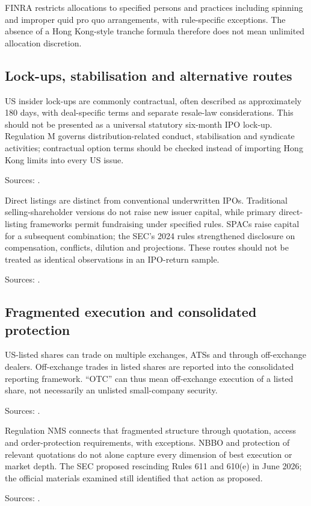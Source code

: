 \documentclass[11pt,a4paper]{article}
\newcommand{\source}[1]{\par{\footnotesize\color{ink}Sources: \cite{#1}.}\par}
\begin{document}
FINRA restricts allocations to specified persons and practices including spinning and improper quid pro quo arrangements, with rule-specific exceptions. The absence of a Hong Kong-style tranche formula therefore does not mean unlimited allocation discretion.

\subsection{Lock-ups, stabilisation and alternative routes}
US insider lock-ups are commonly contractual, often described as approximately 180 days, with deal-specific terms and separate resale-law considerations. This should not be presented as a universal statutory six-month IPO lock-up. Regulation M governs distribution-related conduct, stabilisation and syndicate activities; contractual option terms should be checked instead of importing Hong Kong limits into every US issue.\source{uslock,regm}

Direct listings are distinct from conventional underwritten IPOs. Traditional selling-shareholder versions do not raise new issuer capital, while primary direct-listing frameworks permit fundraising under specified rules. SPACs raise capital for a subsequent combination; the SEC's 2024 rules strengthened disclosure on compensation, conflicts, dilution and projections. These routes should not be treated as identical observations in an IPO-return sample.\source{usofferings,nyseguide,usspac}

\subsection{Fragmented execution and consolidated protection}
US-listed shares can trade on multiple exchanges, ATSs and through off-exchange dealers. Off-exchange trades in listed shares are reported into the consolidated reporting framework. ``OTC'' can thus mean off-exchange execution of a listed share, not necessarily an unlisted small-company security.\source{ustrading,usotc}

Regulation NMS connects that fragmented structure through quotation, access and order-protection requirements, with exceptions. NBBO and protection of relevant quotations do not alone capture every dimension of best execution or market depth. The SEC proposed rescinding Rules 611 and 610(e) in June 2026; the official materials examined still identified that action as proposed.\source{nms,usproposals}
\end{document}
